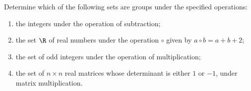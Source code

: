 \begin{exercise}
    Determine which of the following sets are groups under the specified operations:
    \begin{enumerate}
        \item the integers under the operation of subtraction;
        \item the set \(\R\) of real numbers under the operation \(\circ\) given by \(a \circ b = a + b + 2\);
        \item the set of odd integers under the operation of multiplication;
        \item the set of \(n \times n\) real matrices whose determinant is either \(1\) or \( - 1\), under matrix multiplication.
    \end{enumerate}
\end{exercise}

